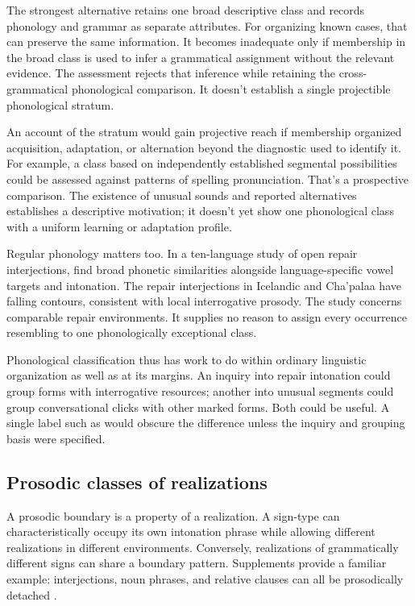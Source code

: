\documentclass[12pt]{article}
\begin{document}
The strongest alternative retains one broad descriptive class and records
phonology and grammar as separate attributes. For organizing known cases,
that can preserve the same information. It becomes inadequate only if
membership in the broad class is used to infer a grammatical assignment
without the relevant evidence. The assessment rejects
that inference while retaining the cross-grammatical phonological
comparison. It doesn't establish a single projectible phonological stratum.

An account of the stratum would gain projective reach if membership
organized acquisition, adaptation, or alternation beyond the diagnostic
used to identify it. For example, a class based on independently
established segmental possibilities could be assessed against patterns of
spelling pronunciation. That's a prospective comparison. The existence
of unusual sounds and reported alternatives establishes a descriptive
motivation; it doesn't yet show one phonological class with a uniform
learning or adaptation profile.

Regular phonology matters too. In a ten-language study of open repair
interjections, \textcite{dingemanse2013huh} find broad phonetic similarities
alongside language-specific vowel targets and intonation. The repair interjections in Icelandic and
Cha'palaa have falling contours, consistent with local interrogative
prosody. The study concerns comparable repair environments. It supplies
no reason to assign every occurrence resembling  to one
phonologically exceptional class.

Phonological classification thus has work to do within ordinary linguistic
organization as well as at its margins. An inquiry into repair intonation
could group forms with interrogative resources; another into unusual
segments could group conversational clicks with other marked forms.
Both could be useful. A single label such as  would obscure
the difference unless the inquiry and grouping basis were specified.

\subsection{Prosodic classes of realizations}

A prosodic boundary is a property of a realization. A sign-type can
characteristically occupy its own intonation phrase while allowing different
realizations in different environments. Conversely, realizations of
grammatically different signs can share a boundary pattern. Supplements
provide a familiar example: interjections, noun phrases, and relative
clauses can all be prosodically detached
\citep[66, 1350]{HuddlestonPullum2002}.
\end{document}
